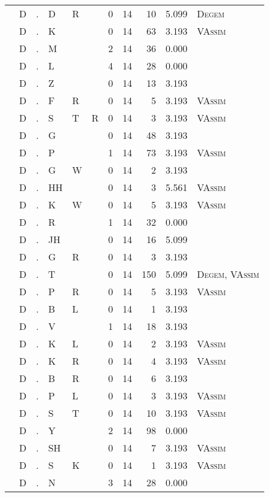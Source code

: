 \begin{longtable}{r@{ } r@{ } c@{ } l@{ } l@{ } l@{ } r r r r l }
 & D & . & D & R &  & 0 & 14 & 10 & 5.099 & \textsc{Degem} \\
 & D & . & K &  &  & 0 & 14 & 63 & 3.193 & \textsc{VAssim} \\
 & D & . & M &  &  & 2 & 14 & 36 & 0.000 &  \\
 & D & . & L &  &  & 4 & 14 & 28 & 0.000 &  \\
 & D & . & Z &  &  & 0 & 14 & 13 & 3.193 &  \\
 & D & . & F & R &  & 0 & 14 & 5 & 3.193 & \textsc{VAssim} \\
 & D & . & S & T & R & 0 & 14 & 3 & 3.193 & \textsc{VAssim} \\
 & D & . & G &  &  & 0 & 14 & 48 & 3.193 &  \\
 & D & . & P &  &  & 1 & 14 & 73 & 3.193 & \textsc{VAssim} \\
 & D & . & G & W &  & 0 & 14 & 2 & 3.193 &  \\
 & D & . & HH &  &  & 0 & 14 & 3 & 5.561 & \textsc{VAssim} \\
 & D & . & K & W &  & 0 & 14 & 5 & 3.193 & \textsc{VAssim} \\
 & D & . & R &  &  & 1 & 14 & 32 & 0.000 &  \\
 & D & . & JH &  &  & 0 & 14 & 16 & 5.099 &  \\
 & D & . & G & R &  & 0 & 14 & 3 & 3.193 &  \\
 & D & . & T &  &  & 0 & 14 & 150 & 5.099 & \textsc{Degem}, \textsc{VAssim} \\
 & D & . & P & R &  & 0 & 14 & 5 & 3.193 & \textsc{VAssim} \\
 & D & . & B & L &  & 0 & 14 & 1 & 3.193 &  \\
 & D & . & V &  &  & 1 & 14 & 18 & 3.193 &  \\
 & D & . & K & L &  & 0 & 14 & 2 & 3.193 & \textsc{VAssim} \\
 & D & . & K & R &  & 0 & 14 & 4 & 3.193 & \textsc{VAssim} \\
 & D & . & B & R &  & 0 & 14 & 6 & 3.193 &  \\
 & D & . & P & L &  & 0 & 14 & 3 & 3.193 & \textsc{VAssim} \\
 & D & . & S & T &  & 0 & 14 & 10 & 3.193 & \textsc{VAssim} \\
 & D & . & Y &  &  & 2 & 14 & 98 & 0.000 &  \\
 & D & . & SH &  &  & 0 & 14 & 7 & 3.193 & \textsc{VAssim} \\
 & D & . & S & K &  & 0 & 14 & 1 & 3.193 & \textsc{VAssim} \\
 & D & . & N &  &  & 3 & 14 & 28 & 0.000 &  \\

\end{longtable}
